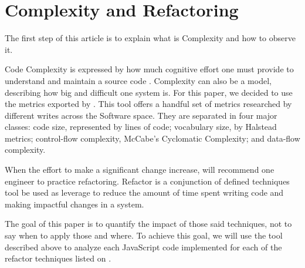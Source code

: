 \section{Complexity and Refactoring}

The first step of this article is to explain what is Complexity and how to observe it.



Code Complexity is expressed by how much cognitive effort one must provide to understand and maintain a source code
\cite{article:fmricc}. Complexity can also be a model, describing how big and difficult one system is. For this paper,
we decided to use the metrics exported by \cite{article:mozilla}. This tool offers a handful set of metrics researched by
different writes across the Software space. They are separated in four major classes: code size, represented by lines of code;
vocabulary size, by Halstead metrics; control-flow complexity, McCabe's Cyclomatic Complexity; and data-flow complexity.


When the effort to make a significant change increase, \cite{book:refactoring} will recommend one engineer to practice
refactoring. Refactor is a conjunction of defined techniques tool be used as leverage to reduce the amount of time spent
writing code and making impactful changes in a system.


The goal of this paper is to quantify the impact of those said techniques, not to say when to apply those and where.
To achieve this goal, we will use the tool described above to analyze each JavaScript code implemented for each of the refactor
techniques listed on \cite{book:refactoring}.
